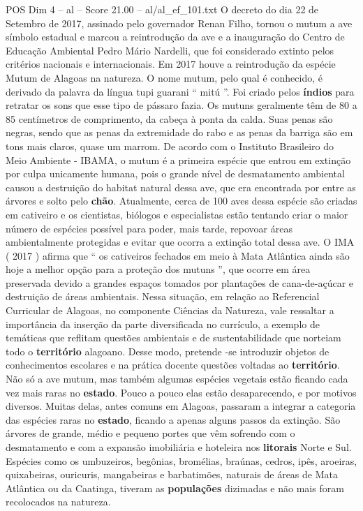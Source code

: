 \begin{textsample}{POS Dim 4 – al – Score 21.00 – al/al\_ef\_101.txt}
O decreto do dia 22 de Setembro de 2017, assinado pelo governador Renan Filho, tornou o mutum a ave símbolo estadual e marcou a reintrodução da ave e a inauguração do Centro de Educação Ambiental Pedro Mário Nardelli, que foi considerado extinto pelos critérios nacionais e internacionais.
Em 2017 houve a reintrodução da espécie Mutum de Alagoas na natureza.
O nome mutum, pelo qual é conhecido, é derivado da palavra da língua tupi guarani “ mitú ”.
Foi criado pelos \textbf{índios} para retratar os sons que esse tipo de pássaro fazia.
Os mutuns geralmente têm de 80 a 85 centímetros de comprimento, da cabeça à ponta da calda.
Suas penas são negras, sendo que as penas da extremidade do rabo e as penas da barriga são em tons mais claros, quase um marrom.
De acordo com o Instituto Brasileiro do Meio Ambiente - IBAMA, o mutum é a primeira espécie que entrou em extinção por culpa unicamente humana, pois o grande nível de desmatamento ambiental causou a destruição do habitat natural dessa ave, que era encontrada por entre as árvores e solto pelo \textbf{chão}.
Atualmente, cerca de 100 aves dessa espécie são criadas em cativeiro e os cientistas, biólogos e especialistas estão tentando criar o maior número de espécies possível para poder, mais tarde, repovoar áreas ambientalmente protegidas e evitar que ocorra a extinção total dessa ave.
O IMA ( 2017 ) afirma que “ os cativeiros fechados em meio à Mata Atlântica ainda são hoje a melhor opção para a proteção dos mutuns ”, que ocorre em área preservada devido a grandes espaços tomados por plantações de cana-de-açúcar e destruição de áreas ambientais.
Nessa situação, em relação ao Referencial Curricular de Alagoas, no componente Ciências da Natureza, vale ressaltar a importância da inserção da parte diversificada no currículo, a exemplo de temáticas que reflitam questões ambientais e de sustentabilidade que norteiam todo o \textbf{território} alagoano.
Desse modo, pretende -se introduzir objetos de conhecimentos escolares e na prática docente questões voltadas ao \textbf{território}.
Não só a ave mutum, mas também algumas espécies vegetais estão ficando cada vez mais raras no \textbf{estado}.
Pouco a pouco elas estão desaparecendo, e por motivos diversos.
Muitas delas, antes comuns em Alagoas, passaram a integrar a categoria das espécies raras no \textbf{estado}, ficando a apenas alguns passos da extinção.
São árvores de grande, médio e pequeno portes que vêm sofrendo com o desmatamento e com a expansão imobiliária e hoteleira nos \textbf{litorais} Norte e Sul.
Espécies como os umbuzeiros, begônias, bromélias, braúnas, cedros, ipês, aroeiras, quixabeiras, ouricuris, mangabeiras e barbatimões, naturais de áreas de Mata Atlântica ou da Caatinga, tiveram as \textbf{populações} dizimadas e não mais foram recolocados na natureza.

\end{textsample}

